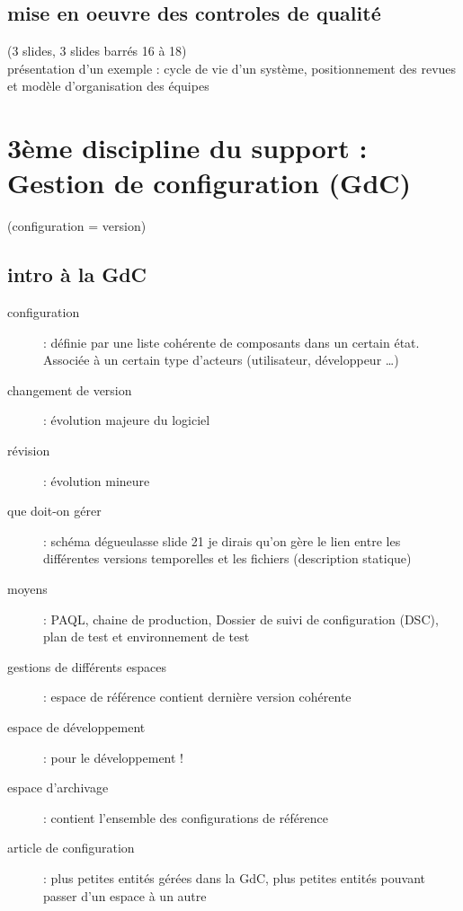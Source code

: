 	\subsection{mise en oeuvre des controles de qualité}
	(3 slides, 3 slides barrés 16 à 18)\\
	présentation d’un exemple : cycle de vie d’un système, positionnement des revues et modèle d’organisation des équipes

\section{3ème discipline du support : Gestion de configuration (GdC)}

(configuration = version)

	\subsection{intro à la GdC}
	\begin{description}
	\item[configuration] : définie par une liste cohérente de composants dans un certain état. Associée à un certain type d’acteurs (utilisateur, développeur …)
	\item[changement de version] : évolution majeure du logiciel
	\item[révision] : évolution mineure
	\end{description}

	\begin{description}
	\item[que doit-on gérer] : schéma dégueulasse slide 21
je dirais qu’on gère le lien entre les différentes versions temporelles et les fichiers (description statique)
	\item[moyens] : PAQL, chaine de production, Dossier de suivi de configuration (DSC), plan de test et environnement de test
	\end{description}

	\begin{description}
	\item[gestions de différents espaces] : espace de référence contient dernière version cohérente
	\item[espace de développement] : pour le développement !
	\item[espace d’archivage] : contient l’ensemble des configurations de référence
	\end{description}

	\begin{description}
	\item[article de configuration] : plus petites entités gérées dans la GdC, plus petites entités pouvant passer d’un espace à un autre
	\end{description}


